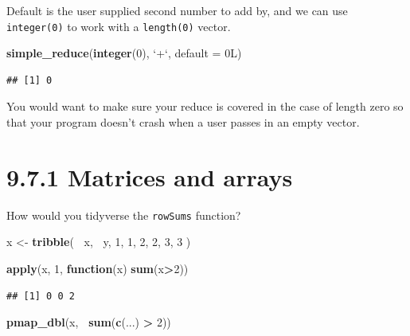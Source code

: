 \documentclass[]{book}
\newenvironment{Shaded}{\begin{snugshade}}{\end{snugshade}}
\newcommand{\ControlFlowTok}[1]{\textcolor[rgb]{0.13,0.29,0.53}{\textbf{#1}}}
\newcommand{\DataTypeTok}[1]{\textcolor[rgb]{0.13,0.29,0.53}{#1}}
\newcommand{\DecValTok}[1]{\textcolor[rgb]{0.00,0.00,0.81}{#1}}
\newcommand{\KeywordTok}[1]{\textcolor[rgb]{0.13,0.29,0.53}{\textbf{#1}}}
\newcommand{\NormalTok}[1]{#1}
\newcommand{\OperatorTok}[1]{\textcolor[rgb]{0.81,0.36,0.00}{\textbf{#1}}}
\newcommand{\StringTok}[1]{\textcolor[rgb]{0.31,0.60,0.02}{#1}}
\begin{document}
Default is the user supplied second number to add by, and we can use \texttt{integer(0)} to work with a \texttt{length(0)} vector.

\begin{Shaded}
\begin{Highlighting}[]
\KeywordTok{simple_reduce}\NormalTok{(}\KeywordTok{integer}\NormalTok{(}\DecValTok{0}\NormalTok{), }\StringTok{`}\DataTypeTok{+}\StringTok{`}\NormalTok{, }\DataTypeTok{default =}\NormalTok{ 0L)}
\end{Highlighting}
\end{Shaded}

\begin{verbatim}
## [1] 0
\end{verbatim}

You would want to make sure your reduce is covered in the case of length zero so that your program doesn't crash when a user passes in an empty vector.

\hypertarget{matrices-and-arrays}{%
\section*{9.7.1 Matrices and arrays}\label{matrices-and-arrays}}

How would you tidyverse the \texttt{rowSums} function?

\begin{Shaded}
\begin{Highlighting}[]
\NormalTok{x <-}\StringTok{ }\KeywordTok{tribble}\NormalTok{(}
  \OperatorTok{~}\NormalTok{x, }\OperatorTok{~}\NormalTok{y,}
  \DecValTok{1}\NormalTok{, }\DecValTok{1}\NormalTok{,}
  \DecValTok{2}\NormalTok{, }\DecValTok{2}\NormalTok{,}
  \DecValTok{3}\NormalTok{, }\DecValTok{3}
\NormalTok{)}

\KeywordTok{apply}\NormalTok{(x, }\DecValTok{1}\NormalTok{, }\ControlFlowTok{function}\NormalTok{(x) }\KeywordTok{sum}\NormalTok{(x}\OperatorTok{>}\DecValTok{2}\NormalTok{))}
\end{Highlighting}
\end{Shaded}

\begin{verbatim}
## [1] 0 0 2
\end{verbatim}

\begin{Shaded}
\begin{Highlighting}[]
\KeywordTok{pmap_dbl}\NormalTok{(x, }\OperatorTok{~}\KeywordTok{sum}\NormalTok{(}\KeywordTok{c}\NormalTok{(...) }\OperatorTok{>}\StringTok{ }\DecValTok{2}\NormalTok{))}
\end{Highlighting}
\end{Shaded}
\end{document}
